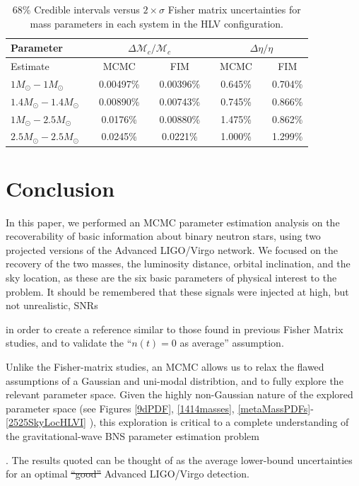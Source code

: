 \documentclass[11pt,a4paper]{emulateapj} 
\newcommand{\carl}[1]{{\color{red} #1}}
\begin{document}
\begin{table}[h!]
\centering
\caption{68\% Credible intervals versus \carl{$2\times\sigma$} Fisher matrix uncertainties for mass parameters in each system in the HLV configuration.}
  \tabcolsep=0.11cm
    {\renewcommand{\arraystretch}{1.3} 
\begin{tabular}{lcccccccc}

\hline\hline Parameter & \vline & \multicolumn{3}{c}{$\Delta\mathcal{M}_c / \mathcal{M}_c$} & \vline & \multicolumn{3}{c}{$\Delta \eta / \eta$} \\ \hline \hline

Estimate & \vline & MCMC & \vline & FIM & \vline & MCMC & \vline & FIM \\ \hline

$1M_{\odot}-1M_{\odot}$ & \vline &  0.00497\% & \vline & 0.00396\% & \vline & 0.645\% & \vline & 0.704\% \\
$1.4M_{\odot}-1.4M_{\odot}$ & \vline &  0.00890\% & \vline & 0.00743\% & \vline & 0.745\% & \vline & 0.866\% \\
$1M_{\odot}-2.5M_{\odot}$& \vline &  0.0176\% & \vline & 0.00880\% & \vline & 1.475\% & \vline & 0.862\% \\
$2.5M_{\odot}-2.5M_{\odot}$& \vline &  0.0245\% & \vline & 0.0221\% & \vline & 1.000\% & \vline & 1.299\% \\

\hline\hline

\end{tabular}}
\label{FIMvsMCMC}
\end{table}

\section{Conclusion}
\label{conclusionSection}

In this paper, we performed an MCMC parameter estimation analysis on
the recoverability of basic information about binary neutron stars,
using two projected versions of the Advanced LIGO/Virgo network.  We
focused on the recovery of the two masses, the luminosity distance,
orbital inclination, and the sky location, as these are the six basic
parameters of physical interest to the problem.  It should be remembered that these signals were injected at high, 
but not unrealistic, SNRs \carl{in order to create a reference similar to those found in previous
Fisher Matrix studies, and to validate the ``$n(t) = 0$ as average'' assumption.  

 Unlike the Fisher-matrix studies, an MCMC allows us to relax the flawed assumptions of a Gaussian and uni-modal 
 distribtion, and to
fully explore the relevant parameter space.  Given the highly non-Gaussian nature of the explored 
parameter space (see Figures \ref{9dPDF}, \ref{1414masses}, \ref{metaMassPDFs}-\ref{2525SkyLocHLVI} ), this exploration is critical to a complete 
understanding of the gravitational-wave BNS parameter estimation problem}.  
The results quoted can be thought of as the
average \carl{lower-bound} uncertainties for an \carl{optimal} \sout{``good''} Advanced LIGO/Virgo detection.
\end{document}
